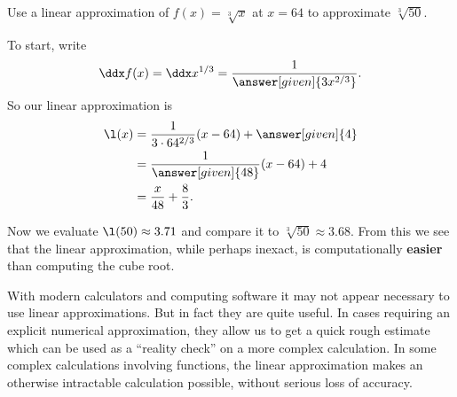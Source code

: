 \documentclass{ximera}
\begin{document}
\begin{example}
Use a linear approximation of $f(x) =\sqrt[3]{x}$ at $x=64$ to
approximate $\sqrt[3]{50}$.
\begin{explanation}
To start, write
\[
\ddx f(x) = \ddx x^{1/3} = \frac{1}{\answer[given]{3x^{2/3}}}.
\]
So our linear approximation is
\begin{align*}
\l(x) &= \frac{1}{3\cdot 64^{2/3}} (x-64) + \answer[given]{4} \\
&= \frac{1}{\answer[given]{48}} (x-64) + 4\\
&= \frac{x}{48} +\frac{8}{3}.
\end{align*}
\begin{image}
\end{image}
Now we evaluate $\l(50) \approx 3.71$ and compare it to
$\sqrt[3]{50}\approx 3.68$.  From this we see that the linear
approximation, while perhaps inexact, is computationally \textbf{easier}
than computing the cube root.
\end{explanation}
\end{example}


With modern calculators and computing software it may not appear
necessary to use linear approximations. But in fact they are quite
useful. In cases requiring an explicit numerical approximation, they
allow us to get a quick rough estimate which can be used as a
``reality check'' on a more complex calculation. In some complex
calculations involving functions, the linear approximation makes an
otherwise intractable calculation possible, without serious loss of
accuracy.
\end{document}
